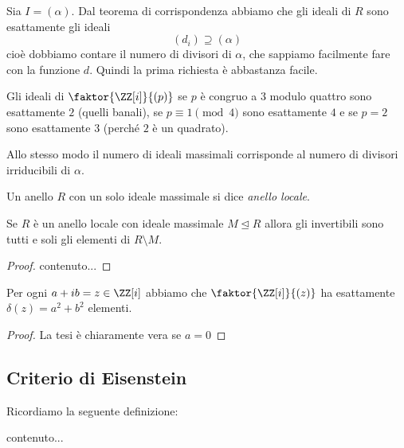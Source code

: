 \documentclass[11pt]{scrartcl}
\newcommand{\normal}{\mathrel{\unlhd}}
\begin{document}
	Sia $I=(\alpha)$. Dal teorema di corrispondenza abbiamo che gli ideali di $R$ sono esattamente gli ideali 
	$$(d_i)\supseteq  (\alpha)$$
	cioè dobbiamo contare il numero di divisori di $\alpha$, che sappiamo facilmente fare con la funzione $d$. Quindi la prima richiesta è abbastanza facile.
	\begin{example}
		Gli ideali di $\faktor{\ZZ[i]}{(p)}$ se $p$ è congruo a $3$ modulo quattro sono esattamente $2$ (quelli banali), se $p\equiv 1 \pmod{4}$ sono esattamente $4$ e se $p=2$ sono esattamente $3$ (perché $2$ è un quadrato).
	\end{example}
	Allo stesso modo il numero di ideali massimali corrisponde al numero di divisori irriducibili di $\alpha$.
	\begin{definition}
		Un anello $R$ con un solo ideale massimale si dice \textit{anello locale}.
	\end{definition}
	\begin{proposition}
		Se $R$ è un anello locale con ideale massimale $M\normal R$ allora gli invertibili sono tutti e soli gli elementi di $R\setminus M$.
	\end{proposition}
	\begin{proof}
		contenuto...
	\end{proof}
	\begin{proposition}
		Per ogni $a+ib=z\in \ZZ[i]$ abbiamo che $\faktor{\ZZ[i]}{(z)}$ ha esattamente $\delta(z)=a^2+b^2$ elementi.
	\end{proposition}
	\begin{proof}
		La tesi è chiaramente vera se $a=0$
	\end{proof}
	
	\subsection{Criterio di Eisenstein}
	
	Ricordiamo la seguente definizione:
	
	\begin{definition}
		contenuto...
	\end{definition}
	
\end{document}
